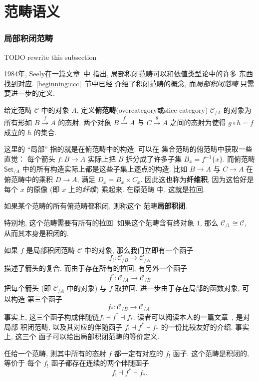 \chapter{范畴语义}
\subsection{局部积闭范畴}
TODO rewrite this subsection

1984年, Seely在一篇文章~\cite{seely:1984:lccc}中
指出, 局部积闭范畴可以和依值类型论中的许多
东西找到对应. \ref{beginning:ccc}~节中已经
介绍了积闭范畴的概念, 而\emph{局部积闭范畴}
只需要进一步的定义.
\begin{definition}
给定范畴 \(\mathcal C\) 中的对象 \(A\),
定义\textbf{俯范畴}(overcategory或slice category)
\(\mathcal C_{/A}\) 的对象为所有形如
\(B \xrightarrow{f} A\) 的态射. 两个对象
\(B \xrightarrow f A\) 与 \(C \xrightarrow g A\)
之间的态射为使得 \(g \circ h = f\) 成立的 \(h\) 的集合.
\end{definition}
这里的 “局部” 指的就是在俯范畴中的构造. 可以在
集合范畴的俯范畴中获取一些直觉： 每个箭头
\(f : B \to A\) 实际上把 \(B\) 拆分成了许多子集
\(B_x = f^{-1}\{x\}\). 而俯范畴 \(\textsf{Set}_{/A}\)
中的所有构造实际上都是这些子集上逐点的构造. 比如
\(B \to A\) 与 \(C \to A\) 在俯范畴中的乘积
\(D \to A\), 满足 \(D_x = B_x \times C_x\).
因此这也称为\textbf{纤维积}, 因为这恰好是每个 \(x\)
的原像 (即 \(x\) 上的\emph{纤维}) 乘起来. 在原范畴
中, 这就是拉回.
\begin{definition}
如果某个范畴的所有俯范畴都积闭, 则称这个
范畴\textbf{局部积闭}.
\end{definition}
特别地, 这个范畴需要有所有的拉回. 如果这个范畴含有终对象
\(1\), 那么 \(\mathcal C_{/1} \cong \mathcal C\),
从而其本身是积闭的.

如果 \(f\) 是局部积闭范畴 \(\mathcal C\)
中的对象, 那么我们立即有一个函子
\[f_! : \mathcal C_{/B} \to \mathcal C_{/A}\]
描述了箭头的复合. 而由于存在所有的拉回, 有另外一个函子
\[f^* : \mathcal C_{/A} \to \mathcal C_{/B}\]
把每个箭头 (即 \(\mathcal C_{/A}\) 中的对象) 与
\(f\) 取拉回. 进一步由于存在局部的函数对象, 可以构造
第三个函子
\[f_* : \mathcal C_{/B} \to \mathcal C_{/A}.\]
事实上, 这三个函子构成伴随链\(f_!\dashv f^*\dashv f_*\).
读者可以阅读本人的一篇文章~\cite{me:2022:lccc}, 是对局部
积闭范畴, 以及其对应的伴随函子 \(f_!\dashv
f^*\dashv f_*\) 的一份比较友好的介绍. 事实上, 这三个
函子可以给出局部积闭范畴的等价定义.
\begin{theorem}
任给一个范畴, 则其中所有的态射 \(f\) 都一定有对应的
\(f_!\) 函子. 这个范畴是积闭的, 等价于
每个 \(f_!\) 函子都存在连续的两个伴随函子
\[f_!\dashv f^*\dashv f_*.\]
\end{theorem}

